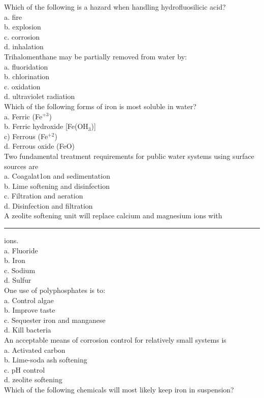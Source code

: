 Which of the following is a hazard when handling hydrofluosilicic acid?\\
a.	fire\\
b.	explosion\\
c.	corrosion\\
d.	inhalation\\
Trihalomenthane may be partially removed from water by:\\
a.	fluoridation\\
b.	chlorination\\
c.	oxidation\\
d.	ultraviolet radiation\\
Which of the following forms of iron is most soluble in water?\\
a. Ferric (Fe$^{+3}$)\\
b. Ferric hydroxide [Fe(OH$_3$)]\\
c) Ferrous (Fe$^{+2}$)\\
d. Ferrous oxide (FeO)\\
Two fundamental treatment requirements for public water systems using surface sources are\\
a. Coagalat1on and sedimentation\\
b. Lime softening and disinfection\\
c. Filtration and aeration \\
d. Disinfection and filtration\\
A zeolite softening unit will replace calcium and magnesium ions with \rule{1.5cm}{0.3mm} ions.\\
a. Fluoride\\
b. Iron\\
c. Sodium\\
d. Sulfur\\
One use of polyphosphates is to:\\
a. Control algae\\
b. Improve taste\\
c. Sequester iron and manganese\\
d. Kill bacteria\\
An acceptable means of corrosion control for relatively small systems is\\
a. Activated carbon\\
b. Lime-soda ash softening\\
c. pH control\\
d. zeolite softening\\
Which of the following chemicals will most likely keep iron in suspension?\\
